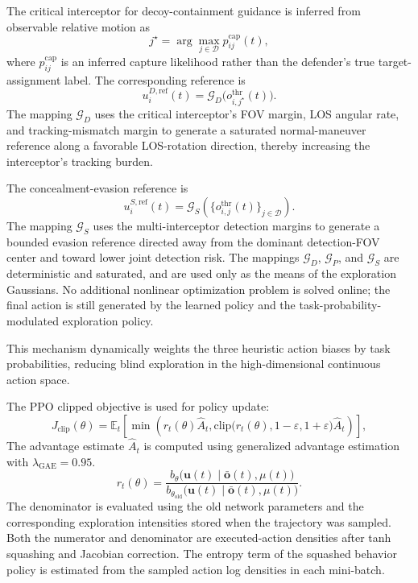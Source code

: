 \documentclass{cja}
\begin{document}
The critical interceptor for decoy-containment guidance is inferred from observable relative motion as
\begin{equation}
j^\star
=
\arg\max_{j\in\mathcal D}p_{ij}^{\mathrm{cap}}(t),
\end{equation}
where $p_{ij}^{\mathrm{cap}}$ is an inferred capture likelihood rather than the defender's true target-assignment label. The corresponding reference is
\begin{equation}
u_i^{D,\mathrm{ref}}(t)
=\mathcal G_D\bigl(o_{i,j^\star}^{\mathrm{thr}}(t)\bigr).
\end{equation}
The mapping $\mathcal G_D$ uses the critical interceptor's FOV margin, LOS angular rate, and tracking-mismatch margin to generate a saturated normal-maneuver reference along a favorable LOS-rotation direction, thereby increasing the interceptor's tracking burden.

The concealment-evasion reference is
\begin{equation}
u_i^{S,\mathrm{ref}}(t)
=\mathcal G_S\!\left(\{o_{i,j}^{\mathrm{thr}}(t)\}_{j\in\mathcal D}\right).
\end{equation}
The mapping $\mathcal G_S$ uses the multi-interceptor detection margins to generate a bounded evasion reference directed away from the dominant detection-FOV center and toward lower joint detection risk. The mappings $\mathcal G_D$, $\mathcal G_P$, and $\mathcal G_S$ are deterministic and saturated, and are used only as the means of the exploration Gaussians. No additional nonlinear optimization problem is solved online; the final action is still generated by the learned policy and the task-probability-modulated exploration policy.

This mechanism dynamically weights the three heuristic action biases by task probabilities, reducing blind exploration in the high-dimensional continuous action space.

The PPO clipped objective is used for policy update:
\begin{equation}
J_{\mathrm{clip}}(\theta)
=
\mathbb E_t
\left[
\min
\left(
r_t(\theta)\hat A_t,
\mathrm{clip}\bigl(r_t(\theta),1-\varepsilon,1+\varepsilon\bigr)\hat A_t
\right)
\right],
\end{equation}
The advantage estimate $\hat A_t$ is computed using generalized advantage estimation with $\lambda_{\mathrm{GAE}}=0.95$.
\begin{equation}
r_t(\theta)
=
\frac{
b_{\theta}\bigl(\mathbf u(t)\mid \bar{\mathbf o}(t),\mu(t)\bigr)
}{
b_{\theta_{\mathrm{old}}}\bigl(\mathbf u(t)\mid \bar{\mathbf o}(t),\mu(t)\bigr)
}.
\end{equation}
The denominator is evaluated using the old network parameters and the corresponding exploration intensities stored when the trajectory was sampled. Both the numerator and denominator are executed-action densities after tanh squashing and Jacobian correction.
The entropy term of the squashed behavior policy is estimated from the sampled action log densities in each mini-batch.
\end{document}
